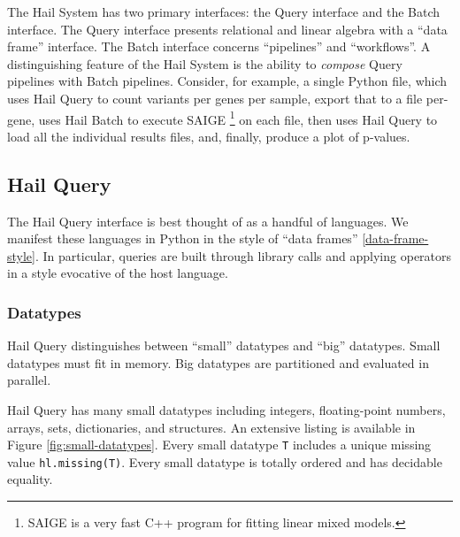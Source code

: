 \documentclass[10pt,a4paper%
]{article}
\begin{document}
The Hail System has two primary interfaces: the Query interface and the Batch interface.
The Query interface presents relational and linear algebra with a ``data frame'' interface.
The Batch interface concerns ``pipelines'' and ``workflows''.
A distinguishing feature of the Hail System is the ability to \emph{compose} Query pipelines with Batch pipelines.
Consider, for example, a single Python file, which uses Hail Query to count variants per genes per sample, export that to a file per-gene, uses Hail Batch to execute SAIGE
\footnote{SAIGE is a very fast C++ program for fitting linear mixed models.}
on each file, then uses Hail Query to load all the individual results files, and, finally, produce a plot of p-values.

\subsection{Hail Query}

The Hail Query interface is best thought of as a handful of languages.
We manifest these languages in Python in the style of ``data frames'' \ref{data-frame-style}.
In particular, queries are built through library calls and applying operators in a style evocative of the host language.

\subsubsection{Datatypes}

Hail Query distinguishes between ``small'' datatypes and  ``big'' datatypes.
Small datatypes must fit in memory.
Big datatypes are partitioned and evaluated in parallel.

Hail Query has many small datatypes including integers, floating-point numbers, arrays, sets, dictionaries, and structures.
An extensive listing is available in Figure \ref{fig:small-datatypes}.
Every small datatype \texttt{T} includes a unique missing value \texttt{hl.missing(T)}.
Every small datatype is totally ordered and has decidable equality.
\end{document}
